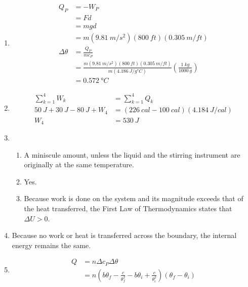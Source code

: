 \documentclass[a4paper,12pt]{article}
\begin{document}
\begin{enumerate}
    \item
        \begin{align*}
            Q_P &= -W_P \\
            &= Fd \\
            &= mgd \\
            &= m (\SI{9.81}{m / s^2}) (\SI{800}{ft}) (\SI{0.305}{m / ft}) \\
            \Delta \theta &= \frac{Q_P}{m c_P} \\
            &= \frac{m (\SI{9.81}{m / s^2}) (\SI{800}{ft}) (\SI{0.305}{m / ft})}{m (\SI{4.186}{J / g \degree C})} \left( \frac{\SI{1}{kg}}{\SI{1000}{g}} \right) \\
            &= \SI{0.572}{\degree C}
        \end{align*}

    \item
        \begin{align*}
            \sum_{k = 1}^{4} W_k &= \sum_{k = 1}^{4} Q_k \\
            \SI{50}{J} + \SI{30}{J} - \SI{80}{J} + W_4 &= (\SI{226}{cal} - \SI{100}{cal}) (\SI{4.184}{J / cal}) \\
            W_4 &= \SI{530}{J}
        \end{align*}

    \item
        \begin{enumerate}
            \item A miniscule amount, unless the liquid and the stirring instrument are originally at the same temperature.

            \item Yes.

            \item Because work is done on the system and its magnitude exceeds that of the heat transferred, the First Law of Thermodynamics states that $\Delta U > 0$.
        \end{enumerate}

    \item
        Because no work or heat is transferred across the boundary, the internal energy remains the same.

    \item
        \begin{align*}
            Q &= n \Delta c_P \Delta \theta \\
            &= n \left( b \theta_f - \frac{c}{\theta_f^2} - b \theta_i + \frac{c}{\theta_i^2} \right) (\theta_f - \theta_i)
        \end{align*}
        

\end{enumerate}
\end{document}
